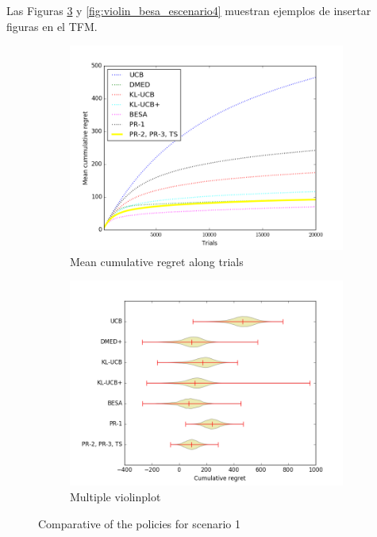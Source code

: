 {{Las Figuras \ref{fig:Bernoulli1} y \ref{fig:violin_besa_escenario4} muestran ejemplos de insertar figuras en el TFM.
\begin{figure}[htb]
\centering
\begin{subfigure}{0.5\textwidth}
\includegraphics[width=\textwidth]{recursos/Figure1a}
\caption{Mean cumulative regret along trials}
\label{fig:Bernoulli1_semilog}
\end{subfigure}
\begin{subfigure}{0.5\textwidth}
\includegraphics[width=\textwidth]{recursos/Figure1b}
\caption{Multiple violinplot}
\label{fig:Bernoulli1_boxplot}
\end{subfigure}
\caption{Comparative of the policies for scenario 1}
\label{fig:Bernoulli1}
\end{figure}

}}
